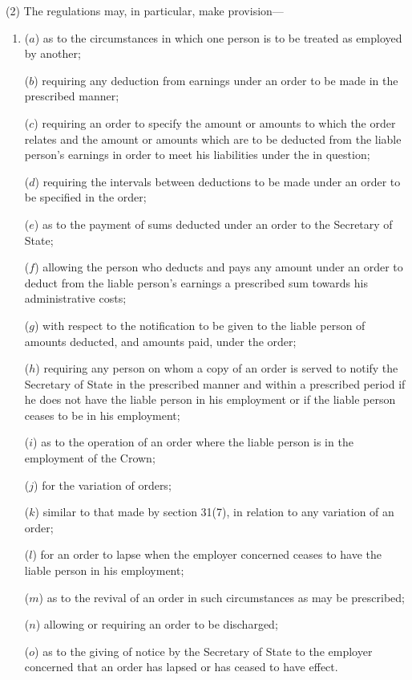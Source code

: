 \documentclass[a4paper]{article}
\begin{document}
(2) The regulations may, in particular, make provision---
\begin{enumerate}\item[]
($a$) as to the circumstances in which one person is to be treated as employed
by another;

($b$) requiring any deduction from earnings under an order to be made in the
prescribed manner;


($c$) requiring an order to specify the amount or amounts to which the order relates and the amount or amounts which are to be deducted from the liable person’s earnings in order to meet his liabilities under the  in question;

($d$) requiring the intervals between deductions to be made under an order to be specified in the order;

($e$) as to the payment of sums deducted under an order to the Secretary of State;

($f$) allowing the person who deducts and pays any amount under an order to deduct from the liable person’s earnings a prescribed sum towards his administrative costs;

($g$) with respect to the notification to be given to the liable person of amounts deducted, and amounts paid, under the order;

($h$) requiring any person on whom a copy of an order is served to notify the Secretary of State in the prescribed manner and within a prescribed period if he does not have the liable person in his employment or if the liable person ceases to be in his employment;

($i$) as to the operation of an order where the liable person is in the employment of the Crown;

($j$) for the variation of orders;

($k$) similar to that made by section 31(7), in relation to any variation of an order;

($l$) for an order to lapse when the employer concerned ceases to have the liable person in his employment;

($m$) as to the revival of an order in such circumstances as may be prescribed;

($n$) allowing or requiring an order to be discharged;

($o$) as to the giving of notice by the Secretary of State to the employer concerned that an order has lapsed or has ceased to have effect.
\end{enumerate}
\end{document}
